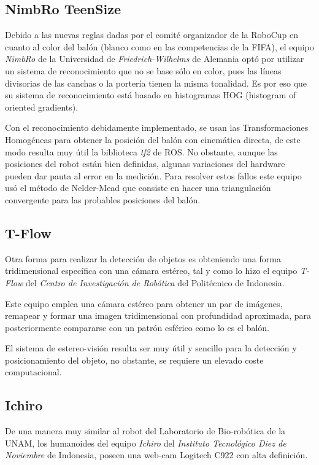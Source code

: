 	 \subsection*{NimbRo TeenSize}
	 Debido a las nuevas reglas dadas por el comité organizador de la RoboCup en cuanto al color del balón (blanco como en las competencias de la FIFA), el equipo \textit{NimbRo} de la Universidad de \textit{Friedrich-Wilhelms} de Alemania optó por utilizar un sistema de reconocimiento que no se base sólo en color, pues las líneas divisorias de las canchas o la portería tienen la misma tonalidad. Es por eso que su sistema de reconocimiento está basado en histogramas HOG (histogram of oriented gradients).
	
	 Con el reconocimiento debidamente implementado, se usan las Transformaciones Homogéneas para obtener la posición del balón con cinemática directa, de este modo resulta muy útil la biblioteca \textit{tf2} de ROS. No obstante, aunque las posiciones del robot están bien definidas, algunas variaciones del hardware pueden dar pauta al error en la medición. Para resolver estos fallos este equipo usó el método de Nelder-Mead que consiste en hacer una triangulación convergente para las probables posiciones del balón.
	 
	 \subsection*{T-Flow}
	 Otra forma para realizar la detección de objetos es obteniendo una forma tridimensional específica con una cámara estéreo, tal y como lo hizo el equipo \textit{T-Flow} del \textit{Centro de Investigación de Robótica} del Politécnico de Indonesia. 
	 

	 Este equipo emplea una cámara estéreo para obtener un par de imágenes, remapear y formar una imagen tridimensional con profundidad aproximada, para posteriormente compararse con un patrón esférico como lo es el balón. 	 


	 El sistema de estereo-visión resulta ser muy útil y sencillo para la detección y posicionamiento del objeto, no obstante, se requiere un elevado coste computacional.
	 
	\subsection*{Ichiro}
	De una manera muy similar al robot del Laboratorio de Bio-robótica de la UNAM, los humanoides del equipo \textit{Ichiro} del \textit{Instituto Tecnológico Diez de Noviembre} de Indonesia, poseen una web-cam Logitech C922 con alta definición.
	
